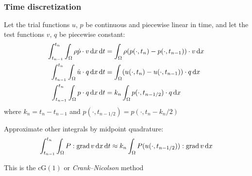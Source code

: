 \begin{frame}
  \frametitle{Time discretization}

  Let the trial functions $u$, $p$ be continuous and piecewise linear
  in time, and let the test functions $v$, $q$ be piecewise constant:
  \begin{align*}
    \int_{t_{n-1}}^{t_n} \int_{\Omega} \rho \dot{p} \cdot v \, \mathrm{d}x \, \mathrm{d}t
    &= \int_{\Omega} \rho (p(\cdot, t_n) - p(\cdot, t_{n-1})) \cdot v \, \mathrm{d}x \\
    \int_{t_{n-1}}^{t_n} \int_{\Omega} \dot{u} \cdot q \, \mathrm{d}x \, \mathrm{d}t
    &= \int_{\Omega} (u(\cdot, t_n) - u(\cdot, t_{n-1})) \cdot q \, \mathrm{d}x \\
    \int_{t_{n-1}}^{t_n} \int_{\Omega} p \cdot q \, \mathrm{d}x \, \mathrm{d}t
    &=
    k_n \int_{\Omega} p(\cdot, t_{n-1/2}) \cdot q \, \mathrm{d}x
  \end{align*}
  where $k_n = t_n - t_{n-1}$ and $p(\cdot, t_{n-1/2}) = p(\cdot, t_n - k_n/2)$

  Approximate other integrals by midpoint quadrature:
  \begin{equation*}
    \int_{t_{n-1}}^{t_n} \int_{\Omega} P : \operatorname{\mathrm{grad}} v \, \mathrm{d}x \, \mathrm{d}t
    \approx
    k_n \int_{\Omega} P(u(\cdot, t_{n-1/2})) : \operatorname{\mathrm{grad}} v \, \mathrm{d}x
  \end{equation*}

  This is the $\mathrm{cG}(1)$ or \emph{Crank--Nicolson} method

\end{frame}
